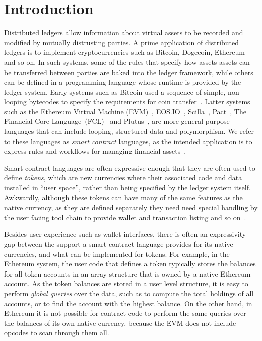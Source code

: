 
\section{Introduction}
Distributed ledgers allow information about virtual assets to be recorded and modified by mutually distrusting parties. A prime application of distributed ledgers is to implement cryptocurrencies such as Bitcoin, Dogecoin, Ethereum and so on. In such systems, some of the rules that specify how assets assets can be transferred between parties are baked into the ledger framework, while others can be defined in a programming language whose runtime is provided by the ledger system. Early systems such as Bitcoin used a sequence of simple, non-looping bytecodes to specify the requirements for coin transfer~\cite{Atzei2017:BitcoinTransactions}. Latter systems such as the Ethereum Virtual Machine (EVM)~\cite{Wood2014:Ethereum}, EOS.IO~\cite{Grigg2017:EosIntroduction}, Scilla~\cite{Sergey2018:Scilla}, Pact~\cite{Popejpy2016:Pact}, The Financial Core Language~(FCL)~\cite{Adjoint2019:FCL} and Plutus~\cite{IOHK2018:Plutus}, are more general purpose languages that can include looping, structured data and polymorphism. We refer to these languages as \emph{smart contract} languages, as the intended application is to express rules and workflows for managing financial assets~\cite{Harz2018:SurveyLanguages}.

Smart contract languages are often expressive enough that they are often used to define \emph{tokens}, which are new currencies where their associated code and data installed in ``user space'', rather than being specified by the ledger system itself. Awkwardly, although these tokens can have many of the same features as the native currency, as they are defined separately they need need special handling by the user facing tool chain to provide wallet and transaction listing and so on~\cite{Vogelsteller2015:ERC20}.

Besides user experience such as wallet interfaces, there is often an expressivity gap between the support a smart contract language provides for its native currencies, and what can be implemented for tokens. For example, in the Ethereum system, the user code that defines a token typically stores  the balances for all token accounts in an array structure that is owned by a native Ethereum account. As the token balances are stored in a user level structure, it is easy to perform \emph{global queries} over the data, such as to compute the total holdings of all accounts, or to find the account with the highest balance. On the other hand, in Ethereum it is not possible for contract code to perform the same queries over the balances of its own native currency, because the EVM does not include opcodes to scan through them all.

